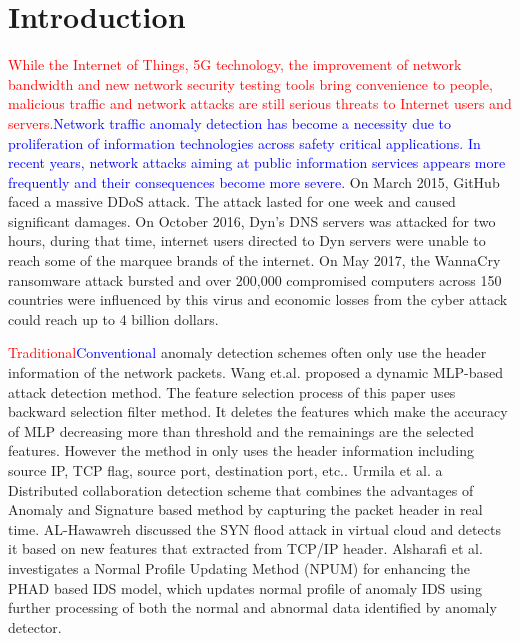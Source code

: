 \documentclass{ieeeaccess}
\theoremstyle{definition}
\newcommand{\change}[2]{\textcolor{red}{#1}\textcolor{blue}{#2}}
\begin{document}
\section{Introduction}
\label{sec:introduction}
\change{While the Internet of Things, 5G technology, the improvement of network bandwidth and new network security testing tools bring convenience to people, malicious traffic and network attacks are still serious threats to Internet users and servers.}{Network traffic anomaly detection has become a necessity due to proliferation of information technologies across safety critical applications. In recent years, network attacks aiming at public information services appears more frequently and their consequences become more severe.}
On March 2015, GitHub faced a massive DDoS attack. The attack lasted for one week and caused significant damages\cite{github-2015}. On October 2016, Dyn's DNS servers was attacked for two hours, during that time, internet users directed to Dyn servers were unable to reach some of the marquee brands of the internet\cite{dyn-2016}. On May 2017, the WannaCry ransomware attack bursted and over 200,000 compromised computers across 150 countries were influenced by this virus and economic losses from the cyber attack could reach up to 4 billion dollars\cite{wannacry-2017}.

\change{Traditional}{Conventional} anomaly detection schemes often only use the header information of the network packets. Wang et.al. \cite{Wang2020CS} proposed a dynamic MLP-based attack detection method. The feature selection process of this paper uses backward selection filter method. It deletes the features which make the accuracy of MLP decreasing more than threshold and the remainings are the selected features. However the method in \cite{Wang2020CS} only uses the header information including source IP, TCP flag, source port, destination port, etc.. Urmila et al.\cite{Urmila2017} a Distributed collaboration detection scheme that combines the advantages of Anomaly and Signature based method by capturing the packet header in real time. AL-Hawawreh\cite{MunaSulieman2017} discussed the SYN flood attack in virtual cloud and detects it based on new features that extracted from TCP/IP header. Alsharafi et al.\cite{Alsharafi2020} investigates a Normal Profile Updating Method (NPUM) for enhancing the PHAD based IDS model, which updates normal profile of anomaly IDS using further processing of both the normal and abnormal data identified by anomaly detector.
\end{document}
